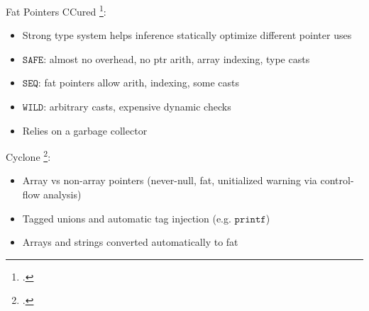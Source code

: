 \documentclass[aspectratio=169]{beamer}
\begin{document}
\begin{frame}{Fat Pointers}
\footnotesize
CCured \footcite{necula_ccured:_2002}:
      \begin{itemize}
          \item Strong type system helps inference statically optimize different pointer uses %
          \item $\texttt{SAFE}$: almost no overhead, no ptr arith, array indexing, type casts
          \item $\texttt{SEQ}$: fat pointers allow arith, indexing, some casts
          \item $\texttt{WILD}$: arbitrary casts, expensive dynamic checks
          \item Relies on a garbage collector
      \end{itemize}

Cyclone \footcite{jim_cyclone:_2002}: %
      \begin{itemize}
          \item Array vs non-array pointers (never-null, fat, unitialized warning via control-flow analysis)
          \item Tagged unions and automatic tag injection (e.g. $\texttt{printf}$)
          \item Arrays and strings converted automatically to fat
      \end{itemize}
\vspace{0.2in}
\end{frame}
\end{document}
